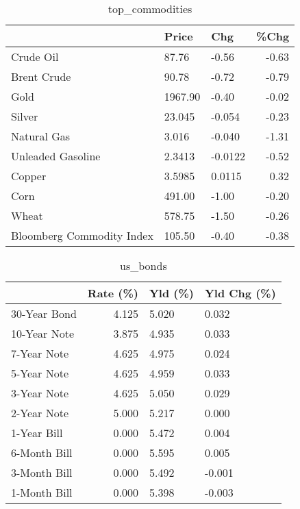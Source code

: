 \documentclass{article}%
\begin{document}
\begin{table}[htbp]%
\caption{top\_commodities}%
\centering%
\begin{adjustbox}{width=1\textwidth}%
\begin{tabular}{lllr}
\toprule
                          &   Price &     Chg &  \%Chg \\
\midrule
               Crude Oil  &   87.76 &   -0.56 & -0.63 \\
             Brent Crude  &   90.78 &   -0.72 & -0.79 \\
                    Gold  & 1967.90 &   -0.40 & -0.02 \\
                  Silver  &  23.045 &  -0.054 & -0.23 \\
             Natural Gas  &   3.016 &  -0.040 & -1.31 \\
       Unleaded Gasoline  &  2.3413 & -0.0122 & -0.52 \\
                  Copper  &  3.5985 &  0.0115 &  0.32 \\
                    Corn  &  491.00 &   -1.00 & -0.20 \\
                   Wheat  &  578.75 &   -1.50 & -0.26 \\
Bloomberg Commodity Index &  105.50 &   -0.40 & -0.38 \\
\bottomrule
\end{tabular}
%
\end{adjustbox}%
\end{table}

%


\begin{table}[htbp]%
\caption{us\_bonds}%
\centering%
\begin{adjustbox}{width=1\textwidth}%
\begin{tabular}{lrll}
\toprule
             &  Rate (\%) & Yld (\%) & Yld Chg (\%) \\
\midrule
30-Year Bond &     4.125 &   5.020 &       0.032 \\
10-Year Note &     3.875 &   4.935 &       0.033 \\
 7-Year Note &     4.625 &   4.975 &       0.024 \\
 5-Year Note &     4.625 &   4.959 &       0.033 \\
 3-Year Note &     4.625 &   5.050 &       0.029 \\
 2-Year Note &     5.000 &   5.217 &       0.000 \\
 1-Year Bill &     0.000 &   5.472 &       0.004 \\
6-Month Bill &     0.000 &   5.595 &       0.005 \\
3-Month Bill &     0.000 &   5.492 &      -0.001 \\
1-Month Bill &     0.000 &   5.398 &      -0.003 \\
\bottomrule
\end{tabular}
%
\end{adjustbox}%
\end{table}
\end{document}
